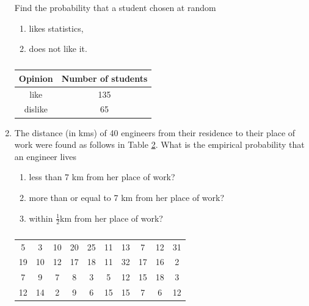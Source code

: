 \begin{enumerate}[label=\arabic*.,ref=\thesubsection.\theenumi]
Find the probability that a student chosen at random
\begin{enumerate}
\item likes statistics,
\item  does not like it.
\end{enumerate}
\begin{table}[!ht]
\centering
\begin{tabular}{ |c|c| } 
 \hline
 \textbf{Opinion} &\textbf{Number of students}\\
 \hline
 like  &135\\ 
 \hline
 dislike  &65\\ 
 \hline
\end{tabular}
\caption{}
\label{table:1.2.6}
\end{table}
\solution


\item The distance (in kms) of 40 engineers from their residence to their place of work were found as follows in Table \ref{table:1.2.7}.
What is the empirical probability that an engineer lives
\begin{enumerate}
\item less than 7 km from her place of work?
\item more than or equal to 7 km from her place of work? 
\item within $\frac{1}{2}$km from her place of work?
\end{enumerate}

\begin{table}[!ht]
\centering
\begin{tabular}{ cccccccccc} 

 5 &3 &10 &20 &25 &11 &13 &7 &12 &31\\
 19 &10 &12 &17 &18 &11 &32 &17 &16 &2\\
 7 &9 &7 &8 &3 &5 &12 &15 &18 &3 \\
 12 &14 &2 &9 &6 &15 &15 &7 &6 &12\\ 
 \end{tabular}\\
\caption{}
\label{table:1.2.7}
\end{table}



\end{enumerate}
